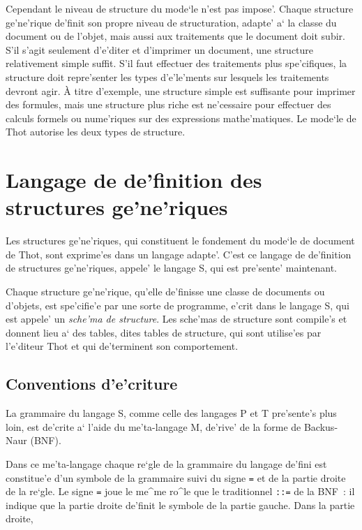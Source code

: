 Cependant le niveau de structure du mode`le n'est pas impose'. Chaque
structure ge'ne'rique de'finit son propre niveau de structuration, adapte' a`
la classe du document ou de l'objet, mais aussi aux traitements que le
document doit subir. S'il s'agit seulement d'e'diter et d'imprimer un
document, une structure relativement simple suffit. S'il faut effectuer
des traitements plus spe'cifiques, la structure doit repre'senter
les types d'e'le'ments sur lesquels les traitements devront agir. \`{A} titre
d'exemple, une structure simple est suffisante pour imprimer des
formules, mais une structure plus riche est ne'cessaire pour effectuer
des calculs formels ou nume'riques sur des expressions mathe'matiques.
Le mode`le de Thot autorise les deux types de structure.

\section{Langage de de'finition des structures ge'ne'riques}

Les structures ge'ne'riques, qui constituent le fondement du mode`le de
document de Thot, sont exprime'es dans un langage adapte'. C'est ce langage
de de'finition de structures ge'ne'riques, appele' le langage S, qui est
pre'sente' maintenant.

Chaque structure ge'ne'rique, qu'elle de'finisse une classe de documents ou
d'objets, est spe'cifie'e par une sorte de programme, e'crit dans le langage S,
qui est appele' un {\em sche'ma de structure}. Les sche'mas de structure sont
compile's et donnent lieu a` des tables, dites tables de structure, qui sont
utilise'es par l'e'diteur Thot et qui de'terminent son comportement.

\subsection{Conventions d'e'criture}
\label{metalang}

La grammaire du langage S, comme celle des langages P et T pre'sente's plus
loin, est de'crite a` l'aide du me'ta-langage M, de'rive' de la forme de
Backus-Naur (BNF).

Dans ce me'ta-langage chaque re`gle de la grammaire du langage de'fini est
constitue'e d'un symbole de la grammaire suivi du signe {\tt =} et de la
partie droite de la re`gle. Le signe {\tt =} joue le me^me ro^le que le
traditionnel {\tt ::=} de la BNF~: il indique que la partie droite de'finit
le symbole de la partie gauche. Dans la partie droite,

